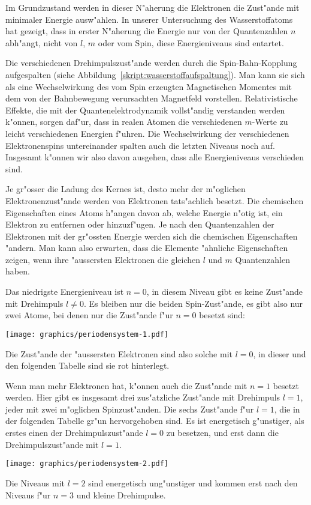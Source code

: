 Im Grundzustand werden in dieser N"aherung die Elektronen die Zust"ande
mit minimaler Energie ausw"ahlen.
In unserer Untersuchung des Wasserstoffatoms hat gezeigt, dass in
erster N"aherung die Energie nur von der Quantenzahlen $n$ abh"angt,
nicht von $l$, $m$ oder vom Spin, diese Energieniveaus sind entartet.

Die verschiedenen Drehimpulszust"ande werden durch die Spin-Bahn-Kopplung
aufgespalten (siehe Abbildung~\ref{skript:wasserstoffaufspaltung}).
Man kann sie sich als eine Wechselwirkung des vom Spin erzeugten
Magnetischen Momentes mit dem von der Bahnbewegung verursachten
Magnetfeld vorstellen.
Relativistische Effekte, die mit der Quantenelektrodynamik vollst"andig
verstanden werden k"onnen, sorgen daf"ur, dass in realen Atomen
die verschiedenen $m$-Werte zu leicht verschiedenen Energien f"uhren.
Die Wechselwirkung der verschiedenen Elektronenspins untereinander
spalten auch die letzten Niveaus noch auf.
Insgesamt k"onnen wir also davon ausgehen, dass alle Energieniveaus
verschieden sind.

Je gr"osser die Ladung des Kernes ist, desto mehr der m"oglichen
Elektronenzust"ande werden von Elektronen tats"achlich besetzt.
Die chemischen Eigenschaften eines Atoms h"angen davon ab, welche
Energie n"otig ist, ein Elektron zu entfernen oder hinzuzf"ugen.
Je nach den Quantenzahlen der Elektronen mit der gr"ossten Energie
werden sich die chemischen Eigenschaften "andern.
Man kann also erwarten, dass die Elemente "ahnliche Eigenschaften
zeigen, wenn ihre "aussersten Elektronen die gleichen $l$ und $m$
Quantenzahlen haben.

Das niedrigste Energieniveau ist $n=0$, in diesem Niveau gibt es
keine Zust"ande mit Drehimpuls $l\ne 0$. Es bleiben nur die
beiden Spin-Zust"ande, es gibt also nur zwei Atome, bei denen nur
die Zust"ande f"ur $n=0$ besetzt sind:
\begin{center}
\texttt{[image: graphics/periodensystem-1.pdf]}
\end{center}
Die Zust"ande der "aussersten Elektronen sind also solche mit
$l=0$, in dieser und den folgenden Tabelle sind sie rot
hinterlegt.

Wenn man mehr Elektronen hat, k"onnen auch die Zust"ande mit $n=1$ 
besetzt werden.
Hier gibt es insgesamt drei zus"atzliche Zust"ande mit Drehimpuls $l=1$,
jeder mit zwei m"oglichen Spinzust"anden.
Die sechs Zust"ande f"ur $l=1$, die in der folgenden Tabelle 
gr"un hervorgehoben sind.
Es ist energetisch g"unstiger, als erstes einen der
Drehimpulszust"ande $l=0$ zu besetzen, und erst dann die Drehimpulszust"ande
mit $l=1$.
\begin{center}
\texttt{[image: graphics/periodensystem-2.pdf]}
\end{center}
Die Niveaus mit $l=2$ sind energetisch ung"unstiger und kommen erst nach
den Niveaus f"ur $n=3$ und kleine Drehimpulse.

